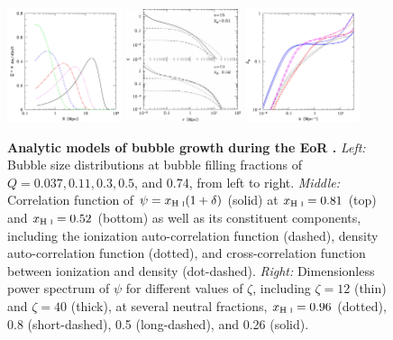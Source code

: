 \begin{figure}[]
\begin{center}
\includegraphics[width=0.3\textwidth]{Mirocha/fzh04_fig2.pdf} \includegraphics[width=0.3\textwidth]{Mirocha/fzh04_fig5.pdf} \includegraphics[width=0.3\textwidth]{Mirocha/fzh04_fig7.pdf}
\end{center}
\caption{{\bf Analytic models of bubble growth during the EoR \cite{Furlanetto2004}.} \textit{Left:} Bubble size distributions at bubble filling fractions of $Q=0.037, 0.11, 0.3, 0.5$, and 0.74, from left to right. \textit{Middle:} Correlation function of $\psi = x_{\text{H } \textsc{i}} (1 + \delta)$ (solid) at $x_{\text{H } \textsc{i}}=0.81$ (top) and $x_{\text{H } \textsc{i}} = 0.52$ (bottom) as well as its constituent components, including the ionization auto-correlation function (dashed), density auto-correlation function (dotted), and cross-correlation function between ionization and density (dot-dashed). \textit{Right:} Dimensionless power spectrum of $\psi$ for different values of $\zeta$, including $\zeta=12$ (thin) and $\zeta=40$ (thick), at several neutral fractions, $x_{\text{H } \textsc{i}}=0.96$ (dotted), 0.8 (short-dashed), 0.5 (long-dashed), and 0.26 (solid).}
\label{fig:fzh04}
\end{figure}

